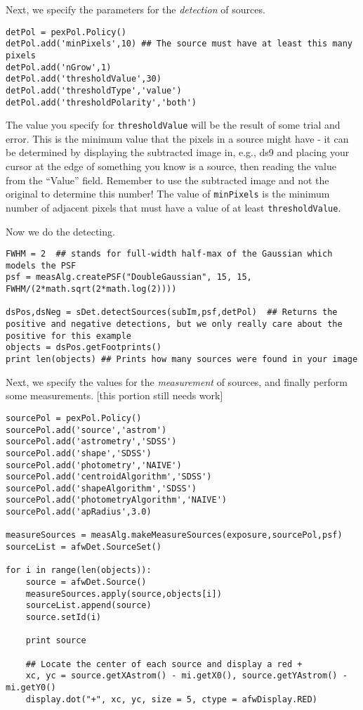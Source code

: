 Next, we specify the parameters for the \textit{detection} of sources.
\begin{verbatim}
detPol = pexPol.Policy()
detPol.add('minPixels',10) ## The source must have at least this many pixels
detPol.add('nGrow',1)
detPol.add('thresholdValue',30)
detPol.add('thresholdType','value')
detPol.add('thresholdPolarity','both')
\end{verbatim}

The value you specify for \texttt{thresholdValue} will be the result of some trial and error. This is the minimum value that the pixels in a source might have - it can be determined by displaying the subtracted image in, e.g., ds9 and placing your cursor at the edge of something you know is a source, then reading the value from the ``Value'' field.  Remember to use the subtracted image and not the original to determine this number!  The value of \texttt{minPixels} is the minimum number of adjacent pixels that must have a value of at least \texttt{thresholdValue}.

Now we do the detecting.

\begin{verbatim}
FWHM = 2  ## stands for full-width half-max of the Gaussian which models the PSF
psf = measAlg.createPSF("DoubleGaussian", 15, 15, FWHM/(2*math.sqrt(2*math.log(2))))

dsPos,dsNeg = sDet.detectSources(subIm,psf,detPol)  ## Returns the positive and negative detections, but we only really care about the positive for this example
objects = dsPos.getFootprints()
print len(objects) ## Prints how many sources were found in your image
\end{verbatim}

Next, we specify the values for the \textit{measurement} of sources, and finally perform some measurements. [this portion still needs work]
\begin{verbatim}
sourcePol = pexPol.Policy()
sourcePol.add('source','astrom')
sourcePol.add('astrometry','SDSS')
sourcePol.add('shape','SDSS')
sourcePol.add('photometry','NAIVE')
sourcePol.add('centroidAlgorithm','SDSS')
sourcePol.add('shapeAlgorithm','SDSS')
sourcePol.add('photometryAlgorithm','NAIVE')
sourcePol.add('apRadius',3.0)

measureSources = measAlg.makeMeasureSources(exposure,sourcePol,psf)
sourceList = afwDet.SourceSet()

for i in range(len(objects)):
    source = afwDet.Source()
    measureSources.apply(source,objects[i])
    sourceList.append(source)
    source.setId(i)

    print source

    ## Locate the center of each source and display a red +
    xc, yc = source.getXAstrom() - mi.getX0(), source.getYAstrom() - mi.getY0()
    display.dot("+", xc, yc, size = 5, ctype = afwDisplay.RED)

\end{verbatim}
